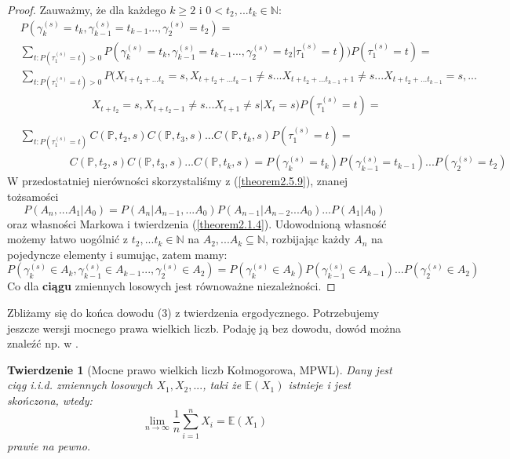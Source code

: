 \documentclass[a4paper]{article}
\theoremstyle{defn}
\theoremstyle{theorem}
\newtheorem{theorem}[defn]{Twierdzenie}
\theoremstyle{lemma}
\theoremstyle{cor}
\theoremstyle{fact}
\begin{document}
\begin{proof}
Zauważmy, że dla każdego $k \geq 2$ i $0 < t_2,...t_k \in \mathbb{N}$:
\begin{align*}
    &P(\gamma_k^{(s)} = t_k, \gamma_{k-1}^{(s)} = t_{k-1} ..., \gamma_2^{(s)} = t_2) =\\
    &\sum\limits_{t: P(\tau_1^{(s)} = t) > 0} P(\gamma_k^{(s)} =t_k, \gamma_{k-1}^{(s)} = t_{k-1} ..., \gamma_2^{(s)} = t_2 | \tau_1^{(s)} = t))P(\tau_1^{(s)} = t) =\\
    &\sum\limits_{t: P(\tau_1^{(s)} = t) > 0} P(X_{t+t_2+...t_k} = s, X_{t+t_2+...t_k - 1} \neq s ... X_{t+t_2+...t_{k-1} + 1} \neq s ... X_{t+t_2+...t_{k-1}} = s, ...\\
    &\quad\quad\quad\quad\quad\quad\,\,\, X_{t+t_2} = s, X_{t+t_2 - 1} \neq s ... X_{t+1} \neq s|X_t = s)P(\tau_1^{(s)} = t) = \\\\
    &\sum\limits_{t: P(\tau_1^{(s)} = t)} C(\mathbb{P}, t_2, s)C(\mathbb{P}, t_3, s)...C(\mathbb{P}, t_k, s)P(\tau_1^{(s)} = t) =\\
    &\quad\quad\quad\quad\,\,\, C(\mathbb{P}, t_2, s)C(\mathbb{P}, t_3, s)...C(\mathbb{P}, t_k, s) = P(\gamma_k^{(s)} = t_k) P(\gamma_{k-1}^{(s)} = t_{k-1}) ...P(\gamma_2^{(s)} = t_2)
\end{align*}
W przedostatniej nierówności skorzystaliśmy z (\ref{theorem2.5.9}), znanej tożsamości
$$P(A_n, ... A_1|A_0) = P(A_n|A_{n-1}, ...A_0)P(A_{n-1}|A_{n-2}...A_0)...P(A_1|A_0)$$
oraz własności Markowa i twierdzenia (\ref{theorem2.1.4}). Udowodnioną własność możemy łatwo uogólnić z $t_2, ... t_k \in \mathbb{N}$ na $A_2, ... A_k \subseteq \mathbb{N}$, rozbijając każdy $A_n$ na pojedyncze elementy i sumując, zatem mamy:
$$P(\gamma_k^{(s)} \in A_k, \gamma_{k-1}^{(s)} \in A_{k-1} ..., \gamma_2^{(s)} \in A_2) = P(\gamma_k^{(s)} \in A_k) P(\gamma_{k-1}^{(s)} \in A_{k-1}) ...P(\gamma_2^{(s)} \in A_{2})$$
Co dla \textbf{ciągu} zmiennych losowych jest równoważne niezależności.
\end{proof}
Zbliżamy się do końca dowodu (3) z twierdzenia ergodycznego. Potrzebujemy jeszcze wersji mocnego prawa wielkich liczb. Podaję ją bez dowodu, dowód można znaleźć np. w \cite{sztencel}.
\begin{theorem}[Mocne prawo wielkich liczb Kołmogorowa, MPWL]\label{theorem2.5.10}
Dany jest ciąg i.i.d. zmiennych losowych $X_1, X_2, ... $, taki że $\mathbb{E}(X_1)$ istnieje i jest skończona, wtedy:
$$ \lim\limits_{n \to \infty} \frac{1}{n}\sum\limits_{i=1}^n X_i = \mathbb{E}(X_1)$$
prawie na pewno.
\end{theorem}
\end{document}

